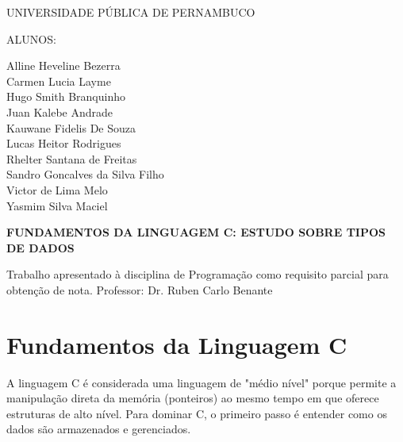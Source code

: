 \documentclass{article}
\begin{document}
\begin{titlepage}

\centering

{\Large UNIVERSIDADE PÚBLICA DE PERNAMBUCO\par}

\vspace{1.5cm}

{\large ALUNOS:\par}

\vspace{0.5cm}

Alline Heveline Bezerra\\
Carmen Lucia Layme\\
Hugo Smith Branquinho\\
Juan Kalebe Andrade\\
Kauwane Fidelis De Souza\\
Lucas Heitor Rodrigues\\
Rhelter Santana de Freitas\\
Sandro Goncalves da Silva Filho\\
Victor de Lima Melo\\
Yasmim Silva Maciel\\

\vfill

{\LARGE \textbf{FUNDAMENTOS DA LINGUAGEM C: ESTUDO SOBRE TIPOS DE DADOS}\par}

\vspace{1cm}

\begin{flushright}
Trabalho apresentado à disciplina de Programação como requisito parcial para obtenção de nota. Professor: Dr. Ruben Carlo Benante
\end{flushright}

\vfill

\end{titlepage}


\section{Fundamentos da Linguagem C}

A linguagem C é considerada uma linguagem de "médio nível" porque permite a manipulação direta da memória (ponteiros) ao mesmo tempo em que oferece estruturas de alto nível. Para dominar C, o primeiro passo é entender como os dados são armazenados e gerenciados.
\end{document}
